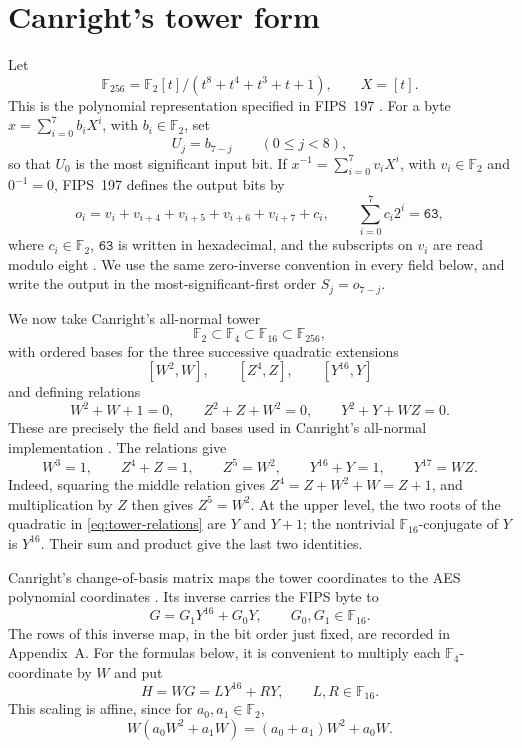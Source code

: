 \documentclass[11pt]{article}
\newcommand{\F}{\mathbb F}
\begin{document}
\section{Canright's tower form}

Let
\[
 \F_{256}=\F_2[t]/(t^8+t^4+t^3+t+1),\qquad X=[t].
\]
This is the polynomial representation specified in FIPS~197
\cite[Secs.~3.2 and 4, Eqs.~(4.1) and (4.3)]{fips}.  For a byte
\(x=\sum_{i=0}^7 b_iX^i\), with \(b_i\in\F_2\), set
\[
 U_j=b_{7-j}\qquad(0\leq j<8),
\]
so that \(U_0\) is the most significant input bit.  If
\(x^{-1}=\sum_{i=0}^7v_iX^i\), with \(v_i\in\F_2\) and \(0^{-1}=0\),
FIPS~197 defines the output bits by
\begin{equation}\label{eq:fips-affine}
 o_i=v_i+v_{i+4}+v_{i+5}+v_{i+6}+v_{i+7}+c_i,
 \qquad \sum_{i=0}^7c_i2^i=\mathtt{63},
\end{equation}
where \(c_i\in\F_2\), \(\mathtt{63}\) is written in hexadecimal, and the
subscripts on \(v_i\) are read modulo eight
\cite[Sec.~5.1.1, Eqs.~(5.2)--(5.3)]{fips}.  We use
the same zero-inverse convention in every field below, and write the output
in the most-significant-first order \(S_j=o_{7-j}\).

We now take Canright's all-normal tower
\[
 \F_2\subset\F_4\subset\F_{16}\subset\F_{256},
\]
with ordered bases for the three successive quadratic extensions
\[
 [W^2,W],\qquad [Z^4,Z],\qquad [Y^{16},Y]
\]
and defining relations
\begin{equation}\label{eq:tower-relations}
 W^2+W+1=0,\qquad Z^2+Z+W^2=0,\qquad
 Y^2+Y+WZ=0.
\end{equation}
These are precisely the field and bases used in Canright's all-normal
implementation \cite[Sec.~2.1]{canright}.  The relations give
\begin{equation}\label{eq:tower-consequences}
 W^3=1,\qquad Z^4+Z=1,\qquad Z^5=W^2,\qquad
 Y^{16}+Y=1,\qquad Y^{17}=WZ.
\end{equation}
Indeed, squaring the middle relation gives
\(Z^4=Z+W^2+W=Z+1\), and multiplication by \(Z\) then gives
\(Z^5=W^2\).  At the upper level, the two roots of the quadratic in
\eqref{eq:tower-relations} are \(Y\) and \(Y+1\); the nontrivial
\(\F_{16}\)-conjugate of \(Y\) is \(Y^{16}\).  Their sum and product give
the last two identities.

Canright's change-of-basis matrix maps the tower coordinates to the AES
polynomial coordinates \cite[Sec.~4, Eq.~(10)]{canright}.  Its inverse
carries the FIPS byte to
\[
 G=G_1Y^{16}+G_0Y,\qquad G_0,G_1\in\F_{16}.
\]
The rows of this inverse map, in the bit order just fixed, are recorded in
Appendix~A.  For the formulas below, it is convenient to multiply each
\(\F_4\)-coordinate by \(W\) and put
\begin{equation}\label{eq:H-definition}
 H=WG=LY^{16}+RY,\qquad L,R\in\F_{16}.
\end{equation}
This scaling is affine, since for \(a_0,a_1\in\F_2\),
\begin{equation}\label{eq:W-scale}
 W(a_0W^2+a_1W)=(a_0+a_1)W^2+a_0W.
\end{equation}
\end{document}
